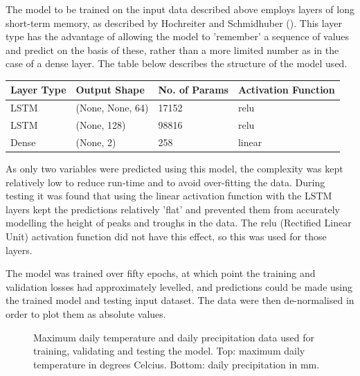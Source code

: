 \documentclass[12pt]{article}
\begin{document}
    The model to be trained on the input data described above employs layers of long short-term memory, as described by Hochreiter and Schmidhuber (\cite{hochreiter_1997_long}). This layer type has the advantage of allowing the model to 'remember' a sequence of values and predict on the basis of these, rather than a more limited number as in the case of a dense layer. The table below describes the structure of the model used.
    
    \begin{table}[H]
    \centering
        \begin{tabular}{ |p{2.5cm}|p{4cm}|p{3.5cm}|p{4cm}| }
         \hline
         Layer Type & Output Shape & No. of Params & Activation Function \\
         \hline
         LSTM  & (None, None, 64) &  17152 & relu   \\
         LSTM  & (None, 128)      &  98816 & relu   \\
         Dense & (None, 2)        &  258   & linear \\
         \hline
        \end{tabular}
    \end{table}

    As only two variables were predicted using this model, the complexity was kept relatively low to reduce run-time and to avoid over-fitting the data. During testing it was found that using the linear activation function with the LSTM layers kept the predictions relatively 'flat' and prevented them from accurately modelling the height of peaks and troughs in the data. The relu (Rectified Linear Unit) activation function did not have this effect, so this was used for those layers. 

    The model was trained over fifty epochs, at which point the training and validation losses had approximately levelled, and predictions could be made using the trained model and testing input dataset. The data were then de-normalised in order to plot them as absolute values.
    
    \begin{figure}
        \centering
        
        \caption{Maximum daily temperature and daily precipitation data used for training, validating and testing the model. Top: maximum daily temperature in degrees Celcius. Bottom: daily precipitation in mm.}
        \label{fig:weather_input_data}
    \end{figure}

    
\end{document}
